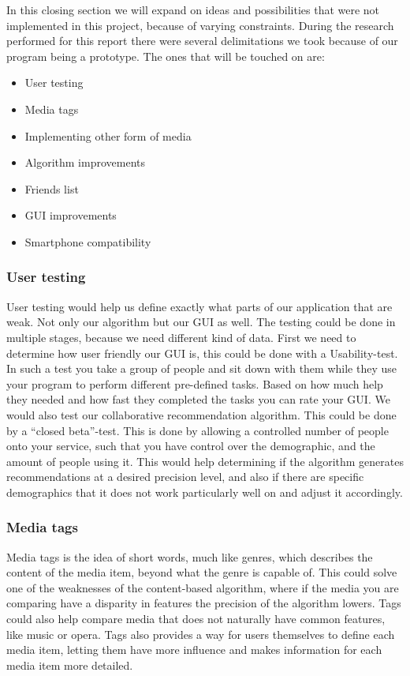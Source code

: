 In this closing section we will expand on ideas and possibilities that were not implemented in this project, because of varying constraints. During the research performed for this report there were several delimitations we took because of our program being a prototype. The ones that will be touched on are:
\begin{itemize}
\item User testing
\item Media tags
\item Implementing other form of media
\item Algorithm improvements
\item Friends list
\item GUI improvements
\item Smartphone compatibility 
\end{itemize}

\subsubsection{User testing}
User testing would help us define exactly what parts of our application that are weak. Not only our algorithm but our GUI as well. The testing could be done in multiple stages, because we need different kind of data. First we need to determine how user friendly our GUI is, this could be done with a Usability-test. In such a test you take a group of people and sit down with them while they use your program to perform different pre-defined tasks. Based on how much help they needed and how fast they completed the tasks you can rate your GUI. We would also test our collaborative recommendation algorithm. This could be done by a “closed beta”-test. This is done by allowing a controlled number of people onto your service, such that you have control over the demographic, and the amount of people using it. This would help determining if the algorithm generates recommendations at a desired precision level, and also if there are specific demographics that it does not work particularly well on and adjust it accordingly.

\subsubsection{Media tags}\label{futureWork:Tags}
Media tags is the idea of short words, much like genres, which describes the content of the media item, beyond what the genre is capable of. This could solve one of the weaknesses of the content-based algorithm, where if the media you are comparing have a disparity in features the precision of the algorithm lowers. Tags could also help compare media that does not naturally have common features, like music or opera. Tags also provides a way for users themselves to define each media item, letting them have more influence and makes information for each media item more detailed.

